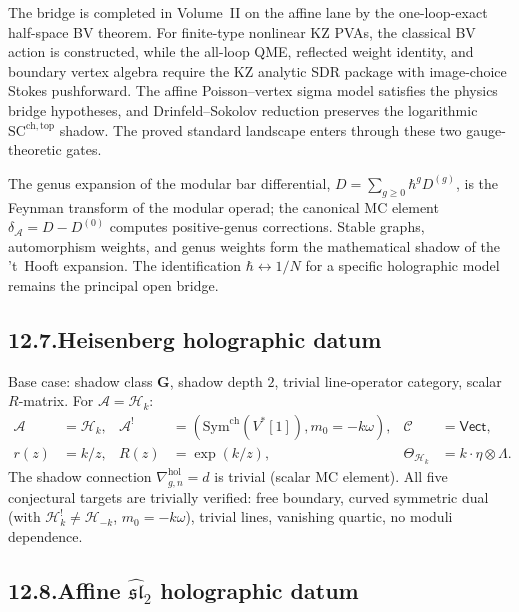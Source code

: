 \documentclass[11pt,reqno]{amsart}
\theoremstyle{definition}
\theoremstyle{remark}
\providecommand{\cA}{\mathcal{A}}
\providecommand{\cC}{\mathcal{C}}
\providecommand{\cH}{\mathcal{H}}
\providecommand{\Sym}{\mathrm{Sym}}
\providecommand{\hol}{\mathrm{hol}}
\providecommand{\SCchtop}{\mathrm{SC}^{\mathrm{ch,top}}}
\providecommand{\ch}{\mathrm{ch}}
\numberwithin{equation}{section}
\begin{document}
The bridge is completed in Volume~II on the affine lane by the
one-loop-exact half-space BV theorem. For finite-type nonlinear KZ
PVAs, the classical BV action is constructed, while the all-loop QME,
reflected weight identity, and boundary vertex algebra require the KZ
analytic SDR package with image-choice Stokes pushforward. The affine
Poisson--vertex sigma model satisfies the physics bridge hypotheses,
and Drinfeld--Sokolov reduction preserves the logarithmic
$\SCchtop$ shadow. The proved standard landscape enters through these
two gauge-theoretic gates.

The genus expansion of the modular bar differential,
$D = \sum_{g \ge 0} \hbar^g D^{(g)}$, is the Feynman transform
of the modular operad; the canonical MC element
$\delta_\cA = D - D^{(0)}$ computes positive-genus corrections.
Stable graphs, automorphism weights, and genus weights form the
mathematical shadow of the 't~Hooft expansion. The
identification $\hbar \leftrightarrow 1/N$ for a specific
holographic model remains the principal open bridge.

\subsection*{12.7.\enspace Heisenberg holographic datum}

Base case: shadow class $\mathbf G$, shadow depth $2$, trivial
line-operator category, scalar $R$-matrix. For $\cA = \cH_k$:
\begin{align*}
\cA &= \cH_k, & \cA^! &= (\Sym^{\ch}(V^*[1]),m_0=-k\omega),
 & \cC &= \mathsf{Vect},\\
r(z) &= k/z, & R(z) &= \exp(k/z),
 & \Theta_{\cH_k} &= k\cdot\eta\otimes\Lambda.
\end{align*}
The shadow connection $\nabla^{\hol}_{g,n} = d$ is trivial
(scalar MC element). All five conjectural targets are
trivially verified: free boundary, curved symmetric dual
(with $\cH_k^! \neq \cH_{-k}$, $m_0 = -k\omega$), trivial
lines, vanishing quartic, no moduli dependence.

\subsection*{12.8.\enspace Affine $\widehat{\mathfrak{sl}}_2$ holographic datum}
\end{document}

